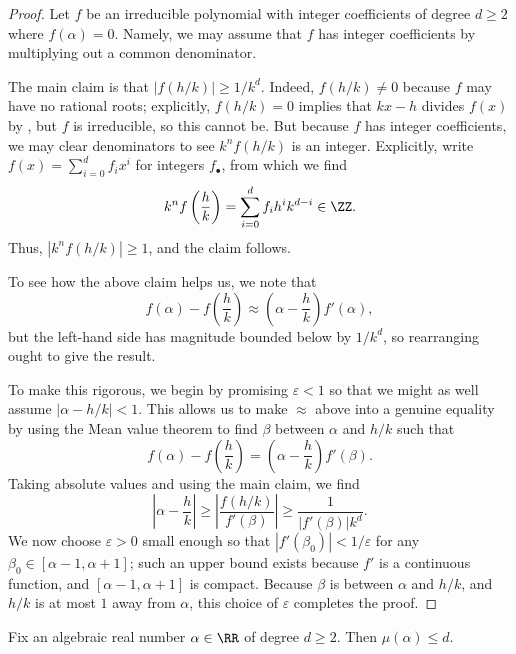 \documentclass[../notes.tex]{subfiles}
\begin{document}
\begin{proof}
	Let $f$ be an irreducible polynomial with integer coefficients of degree $d\ge2$ where $f(\alpha)=0$. Namely, we may assume that $f$ has integer coefficients by multiplying out a common denominator.
	
	The main claim is that $\left|f(h/k)\right|\ge1/k^d$. Indeed, $f(h/k)\ne0$ because $f$ may have no rational roots; explicitly, $f(h/k)=0$ implies that $kx-h$ divides $f(x)$ by , but $f$ is irreducible, so this cannot be. But because $f$ has integer coefficients, we may clear denominators to see $k^nf(h/k)$ is an integer. Explicitly, write $f(x)=\sum_{i=0}^df_ix^i$ for integers $f_\bullet$, from which we find
	\[k^nf\left(\frac hk\right)=\sum_{i=0}^df_ih^ik^{d-i}\in\ZZ.\]
	Thus, $\left|k^nf(h/k)\right|\ge1$, and the claim follows.

	To see how the above claim helps us, we note that
	\[f(\alpha)-f\left(\frac hk\right)\approx\left(\alpha-\frac hk\right)f'(\alpha),\]
	but the left-hand side has magnitude bounded below by $1/k^d$, so rearranging ought to give the result.
	
	To make this rigorous, we begin by promising $\varepsilon<1$ so that we might as well assume $\left|\alpha-h/k\right|<1$. This allows us to make $\approx$ above into a genuine equality by using the Mean value theorem to find $\beta$ between $\alpha$ and $h/k$ such that
	\[f(\alpha)-f\left(\frac hk\right)=\left(\alpha-\frac hk\right)f'(\beta).\]
	Taking absolute values and using the main claim, we find
	\[\left|\alpha-\frac hk\right|\ge\left|\frac{f(h/k)}{f'(\beta)}\right|\ge\frac1{\left|f'(\beta)\right|k^d}.\]
	We now choose $\varepsilon>0$ small enough so that $\left|f'(\beta_0)\right|<1/\varepsilon$ for any $\beta_0\in[\alpha-1,\alpha+1]$; such an upper bound exists because $f'$ is a continuous function, and $[\alpha-1,\alpha+1]$ is compact. Because $\beta$ is between $\alpha$ and $h/k$, and $h/k$ is at most $1$ away from $\alpha$, this choice of $\varepsilon$ completes the proof.
\end{proof}
\begin{corollary} \label{cor:alg-bounds-mu}
	Fix an algebraic real number $\alpha\in\RR$ of degree $d\ge2$. Then $\mu(\alpha)\le d$.
\end{corollary}
\end{document}
